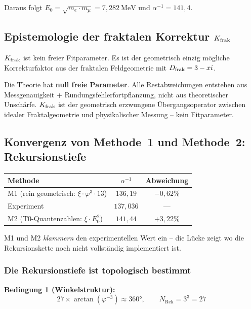 Daraus folgt $E_0 = \sqrt{m_e \cdot m_\mu} = 7{,}282\ \text{MeV}$ und $\alpha^{-1} = 141{,}4$.

\subsection{Epistemologie der fraktalen Korrektur $K_{\text{frak}}$}

$K_{\text{frak}}$ ist kein freier Fitparameter. Es ist der geometrisch einzig mögliche Korrekturfaktor aus der fraktalen Feldgeometrie mit $D_{\text{frak}} = 3 - xi$.

\begin{keyresult}
Die Theorie hat \textbf{null freie Parameter}. Alle Restabweichungen entstehen aus Messgenauigkeit + Rundungsfehlerfortpflanzung, nicht aus theoretischer Unschärfe. $K_{\text{frak}}$ ist der geometrisch erzwungene Übergangsoperator zwischen idealer Fraktalgeometrie und physikalischer Messung -- kein Fitparameter.
\end{keyresult}

\subsection{Konvergenz von Methode~1 und Methode~2: Rekursionstiefe}

\begin{center}
\begin{tabular}{lcc}
\toprule
Methode & $\alpha^{-1}$ & Abweichung \\
\midrule
M1 (rein geometrisch: $\xi\cdot\varphi^3\cdot 13$) & $136{,}19$ & $-0{,}62\%$ \\
Experiment & $137{,}036$ & --- \\
M2 (T0-Quantenzahlen: $\xi\cdot E_0^2$) & $141{,}44$ & $+3{,}22\%$ \\
\bottomrule
\end{tabular}
\end{center}

M1 und M2 \emph{klammern} den experimentellen Wert ein -- die Lücke zeigt wo die Rekursionskette noch nicht vollständig implementiert ist.

\subsubsection*{Die Rekursionstiefe ist topologisch bestimmt}

\textbf{Bedingung 1 (Winkelstruktur):}
\[
  27 \times \arctan(\varphi^{-3}) \approx 360°, \qquad N_{\text{Rek}} = 3^3 = 27
\]

